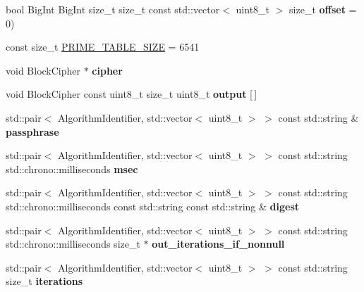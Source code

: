 \begin{DoxyCompactItemize}
bool Big\+Int Big\+Int size\+\_\+t size\+\_\+t const std\+::vector$<$ uint8\+\_\+t $>$ size\+\_\+t {\bfseries offset} = 0)
\item 
const size\+\_\+t \hyperlink{namespace_botan_a501e4632aed1ca4799b03efff7dc59d7}{P\+R\+I\+M\+E\+\_\+\+T\+A\+B\+L\+E\+\_\+\+S\+I\+ZE} = 6541
\item 
\mbox{\label{namespace_botan_af7e75bc4b2f4531cdaca8bbc4ca9e591}} 
void Block\+Cipher $\ast$ {\bfseries cipher}
\item 
\mbox{\label{namespace_botan_abd72d8ad645373d35fd0c7c615a16bc5}} 
void Block\+Cipher const uint8\+\_\+t size\+\_\+t uint8\+\_\+t {\bfseries output} \mbox{[}$\,$\mbox{]}
\item 
\mbox{\label{namespace_botan_ae726c95c302631cc638d1b32435bf9dd}} 
std\+::pair$<$ Algorithm\+Identifier, std\+::vector$<$ uint8\+\_\+t $>$ $>$ const std\+::string \& {\bfseries passphrase}
\item 
\mbox{\label{namespace_botan_ab88a02ae34434437c5d127e8b178e7e7}} 
std\+::pair$<$ Algorithm\+Identifier, std\+::vector$<$ uint8\+\_\+t $>$ $>$ const std\+::string std\+::chrono\+::milliseconds {\bfseries msec}
\item 
\mbox{\label{namespace_botan_a2157b34c32e9bf021cec5d2c9d157360}} 
std\+::pair$<$ Algorithm\+Identifier, std\+::vector$<$ uint8\+\_\+t $>$ $>$ const std\+::string std\+::chrono\+::milliseconds const std\+::string const std\+::string \& {\bfseries digest}
\item 
\mbox{\label{namespace_botan_affb7dc4ad28c1cfa265193e4e893e156}} 
std\+::pair$<$ Algorithm\+Identifier, std\+::vector$<$ uint8\+\_\+t $>$ $>$ const std\+::string std\+::chrono\+::milliseconds size\+\_\+t $\ast$ {\bfseries out\+\_\+iterations\+\_\+if\+\_\+nonnull}
\item 
\mbox{\label{namespace_botan_ae2b14e9474d5ce7a40b9182a46acf9b5}} 
std\+::pair$<$ Algorithm\+Identifier, std\+::vector$<$ uint8\+\_\+t $>$ $>$ const std\+::string size\+\_\+t {\bfseries iterations}
\item 
\mbox{\label{namespace_botan_ad2c1a035f1a32291007db26085877f97}} 

\end{DoxyCompactItemize}
